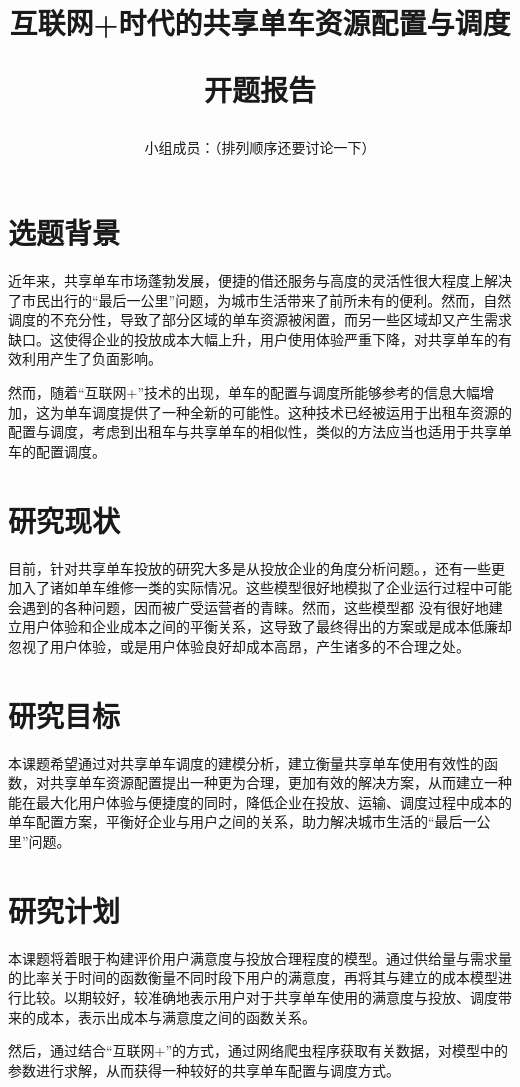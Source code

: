 \documentclass [16pt] {ctexart}
\title{互联网+时代的共享单车资源配置与调度

开题报告}
\author{小组成员：（排列顺序还要讨论一下）}
\date{}
\begin{document}
\maketitle

\section{选题背景}
\par{近年来，共享单车市场蓬勃发展，便捷的借还服务与高度的灵活性很大程度上解决了市民出行的“最后一公里”问题，为城市生活带来了前所未有的便利。然而，自然调度的不充分性，导致了部分区域的单车资源被闲置，而另一些区域却又产生需求缺口。这使得企业的投放成本大幅上升，用户使用体验严重下降，对共享单车的有效利用产生了负面影响。}
\par{然而，随着“互联网+”技术的出现，单车的配置与调度所能够参考的信息大幅增加，这为单车调度提供了一种全新的可能性。这种技术已经被运用于出租车资源的配置与调度\textsuperscript{\cite{安晓丹2015互联网+}}，考虑到出租车与共享单车的相似性，类似的方法应当也适用于共享单车的配置调度。}

\section{研究现状}
\par{目前，针对共享单车投放的研究大多是从投放企业的角度分析问题。\textsuperscript{\cite{于德新2020共享单车调度模型及算法研究}\cite{陈佳惠2021共享单车调度路径优化研究}}，还有一些更加入了诸如单车维修一类的实际情况。\textsuperscript{\cite{王涵霄2019考虑维修的共享单车调度优化研究}}这些模型很好地模拟了企业运行过程中可能会遇到的各种问题，因而被广受运营者的青睐。然而，这些模型都 没有很好地建立用户体验和企业成本之间的平衡关系，这导致了最终得出的方案或是成本低廉却忽视了用户体验，或是用户体验良好却成本高昂，产生诸多的不合理之处。}

\section{研究目标}
\par{本课题希望通过对共享单车调度的建模分析，建立衡量共享单车使用有效性的函数，对共享单车资源配置提出一种更为合理，更加有效的解决方案，从而建立一种能在最大化用户体验与便捷度的同时，降低企业在投放、运输、调度过程中成本的单车配置方案，平衡好企业与用户之间的关系，助力解决城市生活的“最后一公里”问题。}

\section{研究计划}
\par{本课题将着眼于构建评价用户满意度与投放合理程度的模型。通过供给量与需求量的比率关于时间的函数衡量不同时段下用户的满意度，再将其与建立的成本模型进行比较。以期较好，较准确地表示用户对于共享单车使用的满意度与投放、调度带来的成本，表示出成本与满意度之间的函数关系。}
\par{然后，通过结合“互联网+”的方式，通过网络爬虫程序获取有关数据，对模型中的参数进行求解，从而获得一种较好的共享单车配置与调度方式。}



\end{document}
